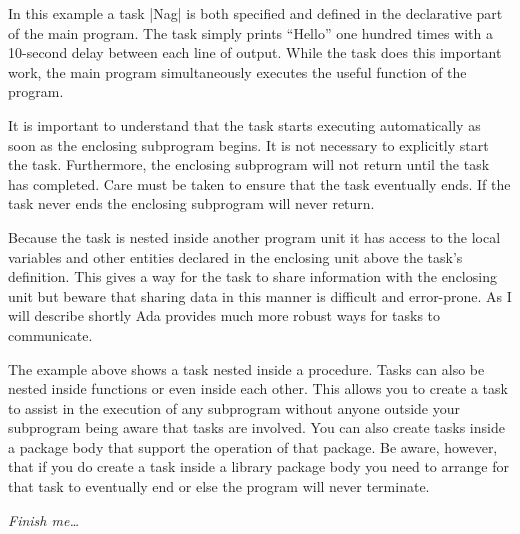 In this example a task |Nag| is both specified and defined in the declarative part of the main
program. The task simply prints ``Hello'' one hundred times with a 10-second delay between each
line of output. While the task does this important work, the main program simultaneously
executes the useful function of the program.

It is important to understand that the task starts executing automatically as soon as the
enclosing subprogram begins. It is not necessary to explicitly start the task. Furthermore, the
enclosing subprogram will not return until the task has completed. Care must be taken to ensure
that the task eventually ends. If the task never ends the enclosing subprogram will never
return.

Because the task is nested inside another program unit it has access to the local variables and
other entities declared in the enclosing unit above the task's definition. This gives a way for
the task to share information with the enclosing unit but beware that sharing data in this
manner is difficult and error-prone. As I will describe shortly Ada provides much more robust
ways for tasks to communicate.

The example above shows a task nested inside a procedure. Tasks can also be nested inside
functions or even inside each other. This allows you to create a task to assist in the execution
of any subprogram without anyone outside your subprogram being aware that tasks are involved.
You can also create tasks inside a package body that support the operation of that package. Be
aware, however, that if you do create a task inside a library package body you need to arrange
for that task to eventually end or else the program will never terminate.

\textit{Finish me\ldots}

